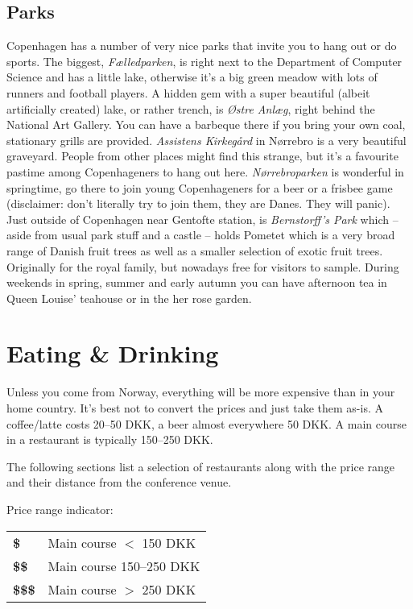\subsection{Parks}
Copenhagen has a number of very nice parks that invite you to hang out or do sports. The biggest, \textit{Fælledparken}, is right next to the Department of Computer Science and has a little lake, otherwise it’s a big green meadow with lots of runners and football players. A hidden gem with a super beautiful (albeit artificially created) lake, or rather trench, is \textit{Østre Anlæg}, right behind the National Art Gallery. You can have a barbeque there if you bring your own coal, stationary grills are provided. \textit{Assistens Kirkegård} in Nørrebro is a very beautiful graveyard. People from other places might find this strange, but it’s a favourite pastime among Copenhageners to hang out here. \textit{Nørrebroparken} is wonderful in springtime, go there to join young Copenhageners for a beer or a frisbee game (disclaimer: don’t literally try to join them, they are Danes. They will panic). Just outside of Copenhagen near Gentofte station, is \textit{Bernstorff’s Park} which – aside from usual park stuff and a castle – holds Pometet which is a very broad range of Danish fruit trees as well as a smaller selection of exotic fruit trees. Originally for the royal family, but nowadays free for visitors to sample. During weekends in spring, summer and early autumn you can have afternoon tea in Queen Louise’ teahouse or in the her rose garden. 



\section{Eating \& Drinking}
Unless you come from Norway, everything will be more expensive than in your home country. It’s best not to convert the prices and just take them as-is. A coffee/latte costs 20--50 DKK, a beer almost everywhere 50 DKK. A main course in a restaurant is typically 150–250 DKK.
\par
The following sections list a selection of restaurants along with the price range and their distance from the conference venue.
\par
\medskip
\noindent Price range indicator: 

\begin{tabular}{l l} 
\textbf{\$} &Main course $<$ 150 DKK\\
\textbf{\$\$}&Main course 150–250 DKK\\
\textbf{\$\$\$} &Main course $>$ 250 DKK
\end{tabular}



